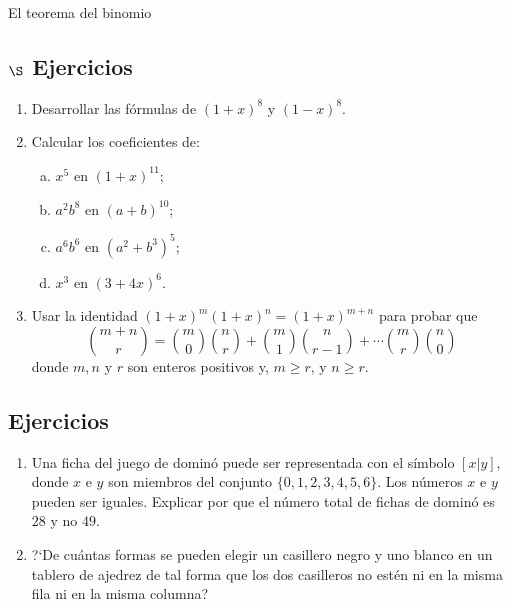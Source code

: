 \begin{section}{El teorema del binomio}
\subsection*{\Large $\S$ Ejercicios}\label{ej3.6.1}

	
	
\begin{enumerate}[1)]
\item Desarrollar las fórmulas de $(1+x)^8$ y $(1-x)^8$.

\item Calcular los coeficientes de:
\begin{multicols}{2}
\begin{enumerate}[a)]
	\item $x^5$ en $(1+x)^{11}$;
	
	\item $a^2b^8 $ en $(a+b)^{10}$;
	
	\item $a^6 b^6$ en $(a^2 +b^3)^5$;
	
	\item $x^3$ en $(3+4x)^6$.
\end{enumerate}	
\end{multicols}
\item Usar la identidad $(1+x)^m(1+x)^n=(1+x)^{m+n}$ para probar que
$$
\binom{m+n}{r} =
\binom{m}{0}\binom{n}{r}+\binom{m}{1}\binom{n}{r-1}+\cdots
\binom{m}{r}\binom{n}{0}
$$
donde $m,n$ y $r$ son enteros positivos y, $m\ge r$, y $n \ge r$.
\end{enumerate}


\section{Ejercicios}

\begin{enumerate}[1)]

\item Una ficha del juego de dominó puede ser representada con el símbolo $[x|y]$,
donde $x$ e $y$ son miembros del conjunto $\{0,1,2,3,4,5,6\}$. Los números $x$
e $y$ pueden ser iguales. Explicar por que el número total de fichas de dominó
es $28$ y no $49$.

\item ?`De cuántas formas se pueden elegir un casillero negro y uno blanco en
un tablero de ajedrez de tal forma que los dos casilleros no estén ni en la misma
fila ni en la misma columna?


\end{enumerate}
\end{section}
